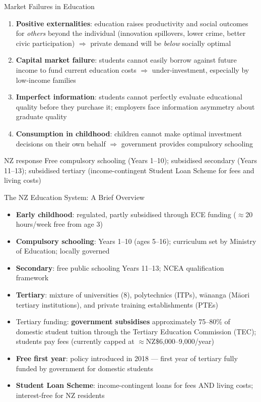 \documentclass[aspectratio=169, 12pt]{beamer}
\begin{document}
\begin{frame}{Market Failures in Education}
  \begin{enumerate}
    \item \textbf{Positive externalities}: education raises productivity and social outcomes
          for \emph{others} beyond the individual (innovation spillovers, lower crime, better
          civic participation) $\Rightarrow$ private demand will be \emph{below} socially optimal
    \item \textbf{Capital market failure}: students cannot easily borrow against future income
          to fund current education costs $\Rightarrow$ under-investment, especially by
          low-income families
    \item \textbf{Imperfect information}: students cannot perfectly evaluate educational
          quality before they purchase it; employers face information asymmetry about graduate
          quality
    \item \textbf{Consumption in childhood}: children cannot make optimal investment decisions
          on their own behalf $\Rightarrow$ government provides compulsory schooling
  \end{enumerate}
  \begin{exampleblock}{NZ response}
    Free compulsory schooling (Years 1--10); subsidised secondary (Years 11--13);
    subsidised tertiary (income-contingent Student Loan Scheme for fees and living costs)
  \end{exampleblock}
\end{frame}

\begin{frame}{The NZ Education System: A Brief Overview}
  \begin{itemize}
    \item \textbf{Early childhood}: regulated, partly subsidised through ECE funding
          ($\approx$20 hours/week free from age 3)
    \item \textbf{Compulsory schooling}: Years 1--10 (ages 5--16); curriculum set by
          Ministry of Education; locally governed
    \item \textbf{Secondary}: free public schooling Years 11--13; NCEA qualification framework
    \item \textbf{Tertiary}: mixture of universities (8), polytechnics (ITPs), wānanga (Māori
          tertiary institutions), and private training establishments (PTEs)
    \item Tertiary funding: \textbf{government subsidises} approximately 75--80\% of domestic
          student tuition through the Tertiary Education Commission (TEC); students pay fees
          (currently capped at $\approx$NZ\$6,000--9,000/year)
    \item \textbf{Free first year}: policy introduced in 2018 --- first year of tertiary
          fully funded by government for domestic students
    \item \textbf{Student Loan Scheme}: income-contingent loans for fees AND living costs;
          interest-free for NZ residents
  \end{itemize}
\end{frame}
\end{document}
